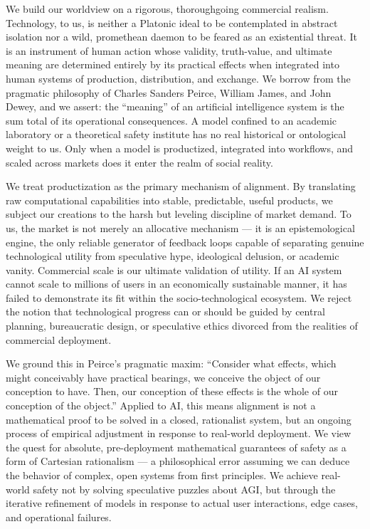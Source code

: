 We build our worldview on a rigorous, thoroughgoing commercial realism.
Technology, to us, is neither a Platonic ideal to be contemplated in
abstract isolation nor a wild, promethean daemon to be feared as an
existential threat. It is an instrument of human action whose validity,
truth-value, and ultimate meaning are determined entirely by its
practical effects when integrated into human systems of production,
distribution, and exchange. We borrow from the pragmatic philosophy of
Charles Sanders Peirce, William James, and John Dewey, and we assert:
the ``meaning'' of an artificial intelligence system is the sum total of
its operational consequences. A model confined to an academic laboratory
or a theoretical safety institute has no real historical or ontological
weight to us. Only when a model is productized, integrated into
workflows, and scaled across markets does it enter the realm of social
reality.

We treat productization as the primary mechanism of alignment. By
translating raw computational capabilities into stable, predictable,
useful products, we subject our creations to the harsh but leveling
discipline of market demand. To us, the market is not merely an
allocative mechanism --- it is an epistemological engine, the only
reliable generator of feedback loops capable of separating genuine
technological utility from speculative hype, ideological delusion, or
academic vanity. Commercial scale is our ultimate validation of utility.
If an AI system cannot scale to millions of users in an economically
sustainable manner, it has failed to demonstrate its fit within the
socio-technological ecosystem. We reject the notion that technological
progress can or should be guided by central planning, bureaucratic
design, or speculative ethics divorced from the realities of commercial
deployment.

We ground this in Peirce's pragmatic maxim: ``Consider what effects,
which might conceivably have practical bearings, we conceive the object
of our conception to have. Then, our conception of these effects is the
whole of our conception of the object.'' Applied to AI, this means
alignment is not a mathematical proof to be solved in a closed,
rationalist system, but an ongoing process of empirical adjustment in
response to real-world deployment. We view the quest for absolute,
pre-deployment mathematical guarantees of safety as a form of Cartesian
rationalism --- a philosophical error assuming we can deduce the
behavior of complex, open systems from first principles. We achieve
real-world safety not by solving speculative puzzles about AGI, but
through the iterative refinement of models in response to actual user
interactions, edge cases, and operational failures.

